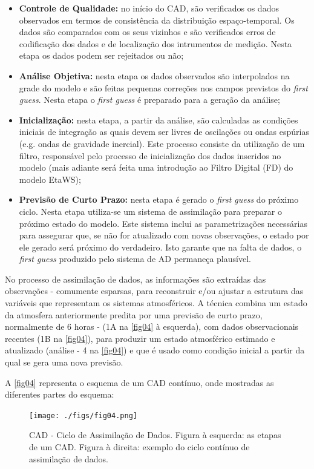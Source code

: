 \begin{itemize}
\item \textbf{Controle de Qualidade:} no início do CAD, são verificados os dados observados em termos de consistência da distribuição espaço-temporal. Os dados são comparados com os seus vizinhos e são verificados erros de codificação dos dados e de localização dos intrumentos de medição. Nesta etapa os dados podem ser rejeitados ou não;
\item \textbf{Análise Objetiva:} nesta etapa os dados observados são interpolados na grade do modelo e são feitas pequenas correções nos campos previstos do \textit{first guess}. Nesta etapa o \textit{first guess} é preparado para a geração da análise;
\item \textbf{Inicialização:} nesta etapa, a partir da análise, são calculadas as condições iniciais de integração as quais devem ser livres de oscilações ou ondas espúrias (e.g. ondas de gravidade inercial). Este processo consiste da utilização de um filtro, responsável pelo processo de inicialização  dos dados inseridos no modelo (mais adiante será feita uma introdução ao Filtro Digital (FD) do modelo EtaWS);
\item \textbf{Previsão de Curto Prazo:} nesta etapa é gerado o \textit{first guess} do próximo ciclo. Nesta etapa utiliza-se um sistema de assimilação para preparar o próximo estado do modelo. Este sistema inclui as parametrizações necessárias para assegurar que, se não for atualizado com novas observações, o estado por ele gerado será próximo do verdadeiro. Isto garante que na falta de dados, o \textit{first guess} produzido pelo sistema de AD permaneça plausível.
\end{itemize}

No processo de assimilação de dados, as informações são extraídas das observações - comumente esparsas, para reconstruir e/ou ajustar a estrutura das variáveis que representam os sistemas atmosféricos. A técnica combina um estado da atmosfera anteriormente predita por uma previsão de curto prazo, normalmente de 6 horas - (1A na \autoref{fig04} à esquerda), com dados observacionais recentes (1B na \autoref{fig04}), para produzir um estado atmosférico estimado e atualizado (análise - 4 na \autoref{fig04}) e que é usado como condição inicial a partir da qual se gera uma nova previsão.

A \autoref{fig04} representa o esquema de um CAD contínuo, onde mostradas as diferentes partes do esquema:

\begin{figure}
\centering
\texttt{[image: ./figs/fig04.png]}
\caption{CAD - Ciclo de Assimilação de Dados. Figura à esquerda: as etapas de um CAD. Figura à direita: exemplo do ciclo contínuo de assimilação de dados.}
\label{fig04}
\end{figure}

